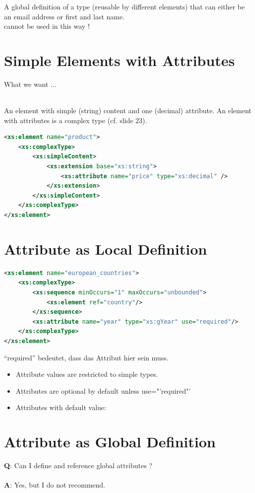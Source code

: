 A global definition of a type (reusable by different elements) that can either be an email address or first and last name.\\
 cannot be used in this way !

\section{Simple Elements with Attributes}
What we want ...

\\
An element with simple (string) content and one (decimal) attribute. An element with attributes is a complex type (cf. slide 23).\\
\begin{lstlisting}[language=XML, caption={Sequences with Global Definitions}]
<xs:element name="product">
	<xs:complexType>
		<xs:simpleContent>
			<xs:extension base="xs:string">
				<xs:attribute name="price" type="xs:decimal" />
			</xs:extension>
		</xs:simpleContent>
	</xs:complexType>
</xs:element>
\end{lstlisting}

\section{Attribute as Local Definition}
\begin{lstlisting}[language=XML, caption={Sequences with Global Definitions}]
<xs:element name="european_countries">
	<xs:complexType>
		<xs:sequence minOccurs="1" maxOccurs="unbounded"> 
			<xs:element ref="country"/>
		</xs:sequence>
		<xs:attribute name="year" type="xs:gYear" use="required"/>
	</xs:complexType>
</xs:element>
\end{lstlisting}
"`required"' bedeutet, dass das Attribut hier sein muss.
\begin{itemize}
\item Attribute values are restricted to simple types.
\item Attributes are optional by default unless use="'required"'
\item Attributes with default value:

\end{itemize}

\section{Attribute as Global Definition}
\textbf{Q}: Can I define and reference global attributes ?\\\\
\textbf{A}: Yes, but I do not recommend.\\

